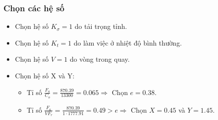             \subsubsection{Chọn các hệ số}
                \begin{itemize}
                    \item Chọn hệ số $K_{\sigma} = 1$ do tải trọng tỉnh.
                    \item Chọn hệ số $K_{t} = 1$ do làm việc ở nhiệt độ bình thường.
                    \item Chọn hệ số $V = 1$ do vòng trong quay.
                    \item Chọn hệ số X và Y:
                        \begin{itemize}
                            \item Tỉ số $\frac{F_{a}}{C_{o}} = \frac{870.39}{13300} = 0.065 \Rightarrow$ Chọn $e = 0.38$.
                            \item Tỉ số $\frac{F_{a}}{VF_{r}} = \frac{870.39}{1 \cdot 1777.91} = 0.49 > e \Rightarrow$ Chọn $X = 0.45$ và $Y = 1.45$.
                        \end{itemize}
                \end{itemize}
